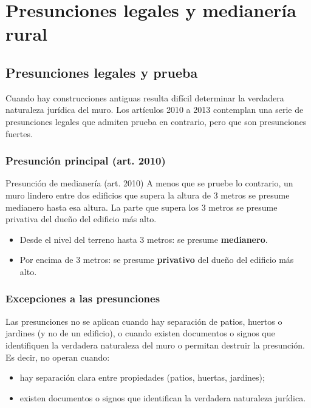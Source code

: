 \documentclass[12pt,oneside]{book}
\begin{document}
\chapter{Presunciones legales y medianería rural}

\section{Presunciones legales y prueba}

Cuando hay construcciones antiguas resulta difícil determinar la verdadera naturaleza jurídica del muro. Los artículos 2010 a 2013 contemplan una serie de presunciones legales que admiten prueba en contrario, pero que son presunciones fuertes.

\subsection{Presunción principal (art. 2010)}

\begin{definition}{Presunción de medianería (art. 2010)}
A menos que se pruebe lo contrario, un muro lindero entre dos edificios que supera la altura de 3 metros se presume medianero hasta esa altura. La parte que supera los 3 metros se presume privativa del dueño del edificio más alto.
\end{definition}

\begin{itemize}
\item Desde el nivel del terreno hasta 3 metros: se presume \textbf{medianero}.
\item Por encima de 3 metros: se presume \textbf{privativo} del dueño del edificio más alto.
\end{itemize}

\subsection{Excepciones a las presunciones}

Las presunciones no se aplican cuando hay separación de patios, huertos o jardines (y no de un edificio), o cuando existen documentos o signos que identifiquen la verdadera naturaleza del muro o permitan destruir la presunción. Es decir, no operan cuando:

\begin{itemize}
\item hay separación clara entre propiedades (patios, huertas, jardines);
\item existen documentos o signos que identifican la verdadera naturaleza jurídica.
\end{itemize}
\end{document}
